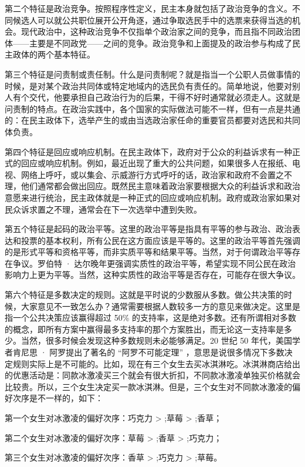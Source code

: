 第二个特征是政治竞争。按照程序性定义，民主本身就包括了政治竞争的含义。不同候选人可以就公共职位展开公开角逐，通过争取选民手中的选票来获得当选的机会。现代政治中，这种政治竞争不仅指单个政治家之间的竞争，而且指不同政治团体——主要是不同政党——之间的竞争。政治竞争和上面提及的政治参与构成了民主政体的两个基本特征。

第三个特征是问责制或责任制。什么是问责制呢？就是指当一个公职人员做事情的时候，是对某个政治共同体或特定地域内的选民负有责任的。简单地说，他要对别人有个交代，他要承担自己政治行为的后果，干得不好时通常就必须走人。这就是问责制的特点。在政治实践中，各个国家的实际做法可能不一样，但有一点是共通的：在民主政体下，选举产生的或由当选政治家任命的重要官员都要对选民和共同体负责。

第四个特征是回应或响应机制。在民主政体下，政府对于公众的利益诉求有一种正式的回应或响应机制。例如，最近出现了重大的公共问题，如果很多人在报纸、电视、网络上呼吁，或以集会、示威游行方式呼吁的话，政治家和政府不会置之不理，他们通常都会做出回应。既然民主意味着政治家要根据大众的利益诉求和政治意愿来进行统治，民主政体就是一种正式的回应或响应机制。政府或政治家如果对民众诉求置之不理，通常会在下一次选举中遭到失败。

第五个特征是起码的政治平等。这里的政治平等是指具有平等的参与政治、政治表达和投票的基本权利，所有公民在这方面应该是平等的。这里的政治平等首先强调的是形式平等和资格平等，而非实质平等和结果平等。当然，对于何谓政治平等存在争议。罗伯特 · 达尔晚年更强调实质性的政治平等，希望实现不同公民在政治影响力上更为平等。当然，这种实质性的政治平等是否存在，可能存在很大争议。

第六个特征是多数决定的规则。这就是平时说的少数服从多数。做公共决策的时候，大家意见不一致怎么办？通常需要根据人数较多一方的意见来做决定。这里是指一个公共决策应该赢得超过 50\% 的支持率，这是绝对多数。还有所谓相对多数的概念，即所有方案中赢得最多支持率的那个方案胜出，而无论这一支持率是多少。当然，很多时候会发现这种多数规则未必能够满足。20 世纪 50 年代，美国学者肯尼思 · 阿罗提出了著名的 “阿罗不可能定理” ，意思是说很多情况下多数决定规则实际上是不可能的。比如，现在有三个女生去买冰淇淋吃。冰淇淋商店给出的优惠活动是：同款冰激凌买三个就会有很大折扣，不同款冰激凌单独买价格就会比较贵。所以，三个女生决定买一款冰淇淋。但是，三个女生对不同款冰激凌的偏好次序是不一样的，如下：

第一个女生对冰激凌的偏好次序：巧克力 > ;草莓 > ;香草；

第二个女生对冰激凌的偏好次序：草莓 > ;香草 > ;巧克力；

第三个女生对冰激凌的偏好次序：香草 > ;巧克力 > ;草莓。

